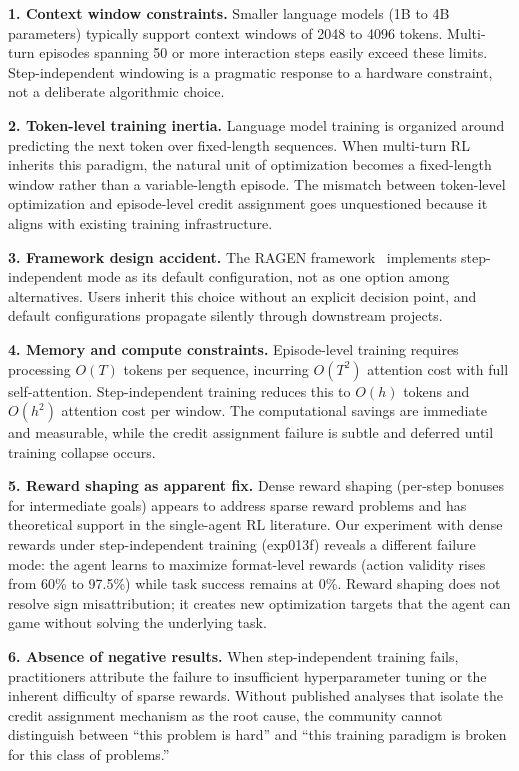\textbf{1. Context window constraints.} Smaller language models (1B to 4B parameters) typically support context windows of 2048 to 4096 tokens. Multi-turn episodes spanning 50 or more interaction steps easily exceed these limits. Step-independent windowing is a pragmatic response to a hardware constraint, not a deliberate algorithmic choice.

\textbf{2. Token-level training inertia.} Language model training is organized around predicting the next token over fixed-length sequences. When multi-turn RL inherits this paradigm, the natural unit of optimization becomes a fixed-length window rather than a variable-length episode. The mismatch between token-level optimization and episode-level credit assignment goes unquestioned because it aligns with existing training infrastructure.

\textbf{3. Framework design accident.} The RAGEN framework~\cite{ragen2025} implements step-independent mode as its default configuration, not as one option among alternatives. Users inherit this choice without an explicit decision point, and default configurations propagate silently through downstream projects.

\textbf{4. Memory and compute constraints.} Episode-level training requires processing $O(T)$ tokens per sequence, incurring $O(T^2)$ attention cost with full self-attention. Step-independent training reduces this to $O(h)$ tokens and $O(h^2)$ attention cost per window. The computational savings are immediate and measurable, while the credit assignment failure is subtle and deferred until training collapse occurs.

\textbf{5. Reward shaping as apparent fix.} Dense reward shaping (per-step bonuses for intermediate goals) appears to address sparse reward problems and has theoretical support in the single-agent RL literature. Our experiment with dense rewards under step-independent training (exp013f) reveals a different failure mode: the agent learns to maximize format-level rewards (action validity rises from 60\% to 97.5\%) while task success remains at 0\%. Reward shaping does not resolve sign misattribution; it creates new optimization targets that the agent can game without solving the underlying task.

\textbf{6. Absence of negative results.} When step-independent training fails, practitioners attribute the failure to insufficient hyperparameter tuning or the inherent difficulty of sparse rewards. Without published analyses that isolate the credit assignment mechanism as the root cause, the community cannot distinguish between ``this problem is hard'' and ``this training paradigm is broken for this class of problems.''

